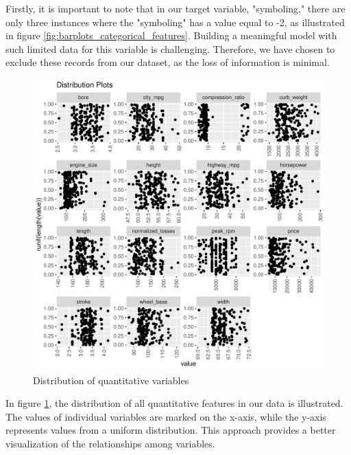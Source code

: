 \documentclass[11pt,a4paper]{article}\usepackage[]{graphicx}\usepackage[]{xcolor}
\makeatletter
\def\maxwidth{ %
  \ifdim\Gin@nat@width>\linewidth
    \linewidth
  \else
    \Gin@nat@width
  \fi
}
\newenvironment{knitrout}{}{} %
\makeatother
\begin{document}
	Firstly, it is important to note that in our target variable, "symboling," there are only three instances where the "symboling" has a value equal to -2, as illustrated in figure \ref{fig:barplots_categorical_features}. Building a meaningful model with such limited data for this variable is challenging. Therefore, we have chosen to exclude these records from our dataset, as the loss of information is minimal.
	
	

	

\begin{knitrout}
\color{fgcolor}\begin{figure}
\includegraphics[width=\maxwidth]{figure/distribution_quantitative-1} \caption[Distribution of quantitative variables]{Distribution of quantitative variables}\label{fig:distribution_quantitative}
\end{figure}

\end{knitrout}
In figure \ref{fig:distribution_quantitative}, the distribution of all quantitative features in our data is illustrated. The values of individual variables are marked on the x-axis, while the y-axis represents values from a uniform distribution. This approach provides a better visualization of the relationships among variables.
\end{document}
